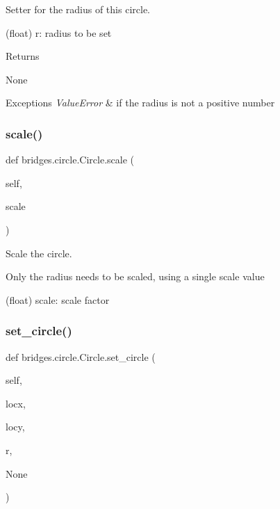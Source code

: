 Setter for the radius of this circle. 

(float) r\+: radius to be set \begin{DoxyReturn}{Returns}


None
\end{DoxyReturn}

\begin{DoxyExceptions}{Exceptions}
{\em Value\+Error} & if the radius is not a positive number \\
\hline
\end{DoxyExceptions}
\mbox{\label{classbridges_1_1circle_1_1_circle_a85f41fd8adbaca617b96b5d656d8d6ff}} 
\subsubsection{\texorpdfstring{scale()}{scale()}}
{\footnotesize\ttfamily def bridges.\+circle.\+Circle.\+scale (\begin{DoxyParamCaption}\item[{}]{self,  }\item[{}]{scale }\end{DoxyParamCaption})}



Scale the circle. 

Only the radius needs to be scaled, using a single scale value \begin{DoxyVerb}       (float) scale: scale factor\end{DoxyVerb}
 \mbox{\label{classbridges_1_1circle_1_1_circle_a42b7ccd17017ca328371ce27e1bdbffe}} 
\subsubsection{\texorpdfstring{set\+\_\+circle()}{set\_circle()}}
{\footnotesize\ttfamily def bridges.\+circle.\+Circle.\+set\+\_\+circle (\begin{DoxyParamCaption}\item[{}]{self,  }\item[{}]{locx,  }\item[{}]{locy,  }\item[{}]{r,  }\item[{}]{None }\end{DoxyParamCaption})}




